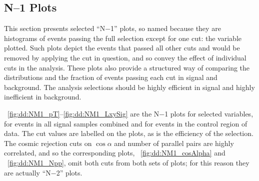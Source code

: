 \subsection{N--1 Plots}
This section presents selected ``N$-$1'' plots, so named because they are histograms of events passing the full selection except for one cut: the variable plotted.
Such plots depict the events that passed all other cuts and would be removed by applying the cut in question, and so convey the effect of individual cuts in the analysis.
These plots also provide a structured way of comparing the distributions and the fraction of events passing each cut in signal and background.
The analysis selections should be highly efficient in signal and highly inefficient in background.

\Figs~\ref{fig:dd:NM1_pT}--\ref{fig:dd:NM1_LxySig} are the N$-$1 plots for selected variables, for events in all \twoMu signal samples combined and for events in the control region \CR{}{\pi} of data.
The cut values are labelled on the plots, as is the efficiency of the selection.
The cosmic rejection cuts on $\cos{\alpha}$ and number of parallel pairs are highly correlated, and so the corresponding plots, \Fig~\ref{fig:dd:NM1_cosAlpha} and \Fig~\ref{fig:dd:NM1_Npp}, omit both cuts from both sets of plots; for this reason they are actually ``N$-$2'' plots.

